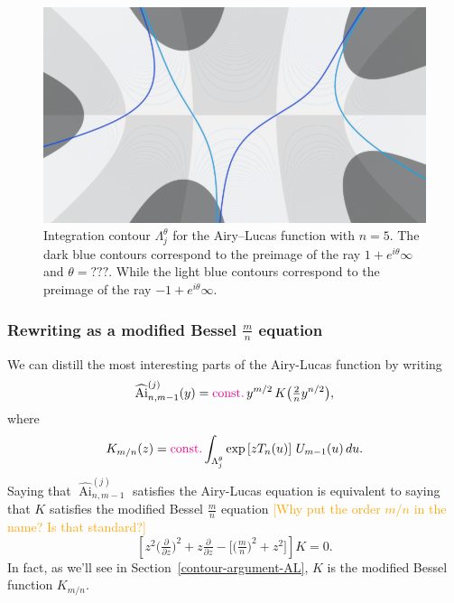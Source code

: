 \documentclass{article}
\DeclareMathOperator{\Ai}{Ai}
\theoremstyle{definition}
\theoremstyle{plain}
\begin{document}
\begin{figure}[ht]
    \centering
   \includegraphics[scale=0.3]{figures/thimble-n5.png}
    \caption{Integration contour $\Lambda^\theta_j$ for the Airy--Lucas function with $n=5$. The dark blue contours correspond to the preimage of the ray $1+e^{i\theta}\infty$ and $\theta=???$. While the light blue contours correspond to the preimage of the ray $-1+e^{i\theta}\infty$.}
    \label{fig:thimble_n_5}
\end{figure}


\subsubsection{Rewriting as a modified Bessel $\frac{m}{n}$ equation}
We can distill the most interesting parts of the Airy-Lucas function by writing
\[ \widehat{\Ai}^{(j)}_{n, m-1}(y) = \textcolor{magenta}{\text{const.}}\,y^{{m/2}}\,K\big(\tfrac{2}{n} y^{n/2}\big), \]
where
\begin{equation}\label{integral:mod-bessel-rational-AL}
K_{m/n}(z) = \textcolor{magenta}{\text{const.}} \int_{\Lambda^\theta_j} \exp\left[z T_n(u)\right]\,U_{m-1}(u)\,du.
\end{equation}
Saying that $\widehat{\Ai}^{(j)}_{n, m-1}$ satisfies the Airy-Lucas equation is equivalent to saying that $K$ satisfies the modified Bessel $\frac{m}{n}$ equation \textcolor{orange}{[Why put the order $m/n$ in the name? Is that standard?]}
\begin{equation}\label{eqn:mod-bessel-AL}
\left[z^2 \big(\tfrac{\partial}{\partial z}\big)^2 + z \tfrac{\partial}{\partial z} - \big[\big(\tfrac{m}{n} \big)^2 + z^2\big]\right] K = 0.
\end{equation}
In fact, as we’ll see in Section~\ref{contour-argument-AL}, $K$ is the modified Bessel function $K_{{m/n}}$.
\end{document}

